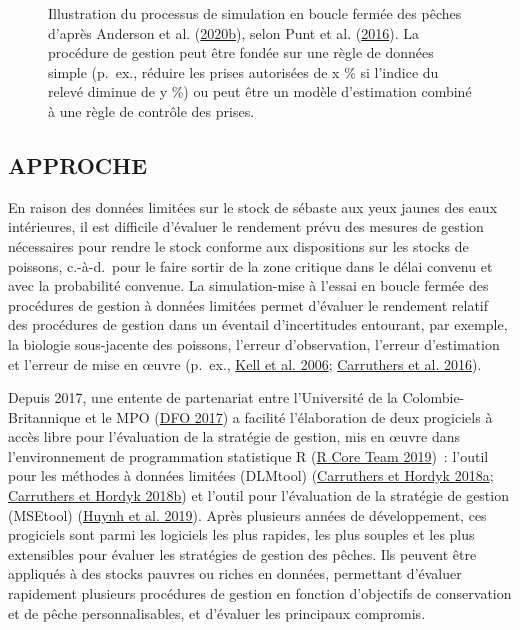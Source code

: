 \documentclass[french,11pt]{book}
\begin{document}
\begin{figure}[htb]

{\centering {} 

}

\caption{Illustration du processus de simulation en boucle fermée des pêches d'après Anderson et al. (\protect\hyperlink{ref-anderson2020gfmp}{2020b}), selon Punt et al. (\protect\hyperlink{ref-punt2016}{2016}). La procédure de gestion peut être fondée sur une règle de données simple (p.~ex., réduire les prises autorisées de x \% si l'indice du relevé diminue de y \%) ou peut être un modèle d'estimation combiné à une règle de contrôle des prises.}\label{fig:mse-chart-basic}
\end{figure}
\hypertarget{sec:introduction-approach}{%
\subsection{APPROCHE}\label{sec:introduction-approach}}

En raison des données limitées sur le stock de sébaste aux yeux jaunes des eaux intérieures, il est difficile d'évaluer le rendement prévu des mesures de gestion nécessaires pour rendre le stock conforme aux dispositions sur les stocks de poissons, c.-à-d.~pour le faire sortir de la zone critique dans le délai convenu et avec la probabilité convenue. La simulation-mise à l'essai en boucle fermée des procédures de gestion à données limitées permet d'évaluer le rendement relatif des procédures de gestion dans un éventail d'incertitudes entourant, par exemple, la biologie sous-jacente des poissons, l'erreur d'observation, l'erreur d'estimation et l'erreur de mise en œuvre (p.~ex., \protect\hyperlink{ref-kell2006}{Kell et al. 2006}; \protect\hyperlink{ref-carruthers2016}{Carruthers et al. 2016}).

Depuis 2017, une entente de partenariat entre l'Université de la Colombie-Britannique et le MPO (\protect\hyperlink{ref-dfo_dlmtool_2017}{DFO 2017}) a facilité l'élaboration de deux progiciels à accès libre pour l'évaluation de la stratégie de gestion, mis en œuvre dans l'environnement de programmation statistique R (\protect\hyperlink{ref-r2019}{R Core Team 2019})~: l'outil pour les méthodes à données limitées (DLMtool) (\protect\hyperlink{ref-carruthers2018}{Carruthers et Hordyk 2018a}; \protect\hyperlink{ref-carruthers_hordyk_2018}{Carruthers et Hordyk 2018b}) et l'outil pour l'évaluation de la stratégie de gestion (MSEtool) (\protect\hyperlink{ref-huynh_msetool_2019}{Huynh et al. 2019}). Après plusieurs années de développement, ces progiciels sont parmi les logiciels les plus rapides, les plus souples et les plus extensibles pour évaluer les stratégies de gestion des pêches. Ils peuvent être appliqués à des stocks pauvres ou riches en données, permettant d'évaluer rapidement plusieurs procédures de gestion en fonction d'objectifs de conservation et de pêche personnalisables, et d'évaluer les principaux compromis.
\end{document}
